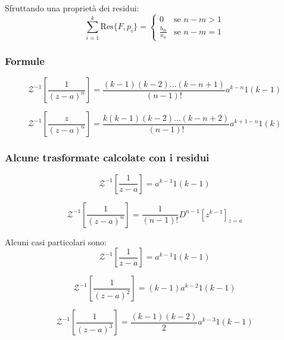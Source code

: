 Sfruttando una proprietà dei residui:
\begin{equation}
  \sum_{i=1}^{k} \text{Res}\{ F, p_i \} = \begin{cases}
    0 & \text{se } n-m > 1 \\
    \frac{b_m}{a_n} & \text{se } n-m = 1
  \end{cases}
\end{equation}


\subsubsection{Formule}
\begin{equation}
  \mathcal{Z}^{-1} \left[ \frac{1}{(z - a)^n} \right] = \frac{(k-1)(k-2) \dots (k - n + 1)}{ (n-1)! } a^{k-n} 1(k - 1)
\end{equation}

\begin{equation}
  \mathcal{Z}^{-1} \left[ \frac{z}{(z - a)^n} \right] = \frac{k(k-1)(k-2) \dots (k - n + 2)}{ (n-1)! } a^{k+1-n} 1(k)
\end{equation}







\subsubsection{Alcune trasformate calcolate con i residui}
\begin{equation}
  \mathcal{Z}^{-1} [ \frac{1}{z-a} ] = a^{k-1} 1(k-1)
\end{equation}

\begin{equation}
  \mathcal{Z}^{-1} \left[ \frac{1}{(z-a)^n} \right] = \frac{1}{(n-1)!} D^{n-1} \left[ z^{k-1} \right]_{z=a}
\end{equation}

Alcuni casi particolari sono:
\begin{equation}
  \mathcal{Z}^{-1} \left[ \frac{1}{z-a} \right] = a^{k-1} 1(k-1)
\end{equation}

\begin{equation}
  \mathcal{Z}^{-1} \left[ \frac{1}{(z-a)^2} \right] = (k-1) a^{k-2} 1(k-1)
\end{equation}

\begin{equation}
  \mathcal{Z}^{-1} \left[ \frac{1}{(z-a)^3} \right] = \frac{(k-1)(k-2)}{2} a^{k-3} 1(k-1)
\end{equation}



